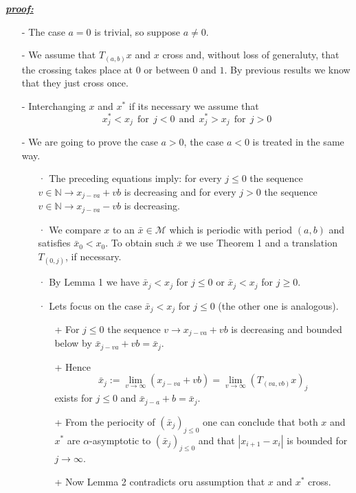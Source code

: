 \documentclass{article}
\begin{document}
\color{blue}
	\noindent \underline{\textbf{\textit{proof:}}} 		
		\begin{itemize}
			\item[-] The case $a = 0$ is trivial, so suppose $a \neq 0$.
			\item[-] We assume that $T_{(a, b)}x$ and $x$ cross and, without loss of generaluty, that the crossing takes place at $0$ or between $0$ and $1$. By previous results we know that they just cross once.
			\item[-] Interchanging $x$ and $x^{*}$ if its necessary we assume that
				$$
					x_{j}^{*} < x_j \ \ \text{for} \ \ j < 0 \ \ \text{and} \ \ x_{j}^{*} > x_j \ \ \text{for} \ \ j > 0
				$$ 
			\item[-] We are going to prove the case $a > 0$, the case $a < 0$ is treated in the same way.
			\begin{itemize}
				\item[·] The preceding equations imply: for every $j \leq 0$ the sequence $v \in \mathbb{N} \rightarrow x_{j - va} + vb$ is decreasing and for every $j > 0$ the sequence $v \in \mathbb{N} \rightarrow x_{j - va} - vb$ is decreasing.
				\item[·] We compare $x$ to an $\bar{x} \in \mathcal{M}$ which is periodic with period $(a, b)$ and satisfies $\bar{x}_{0} < x_{0}$. To obtain such $\bar{x}$ we use Theorem 1 and a translation $T_{(0, j)}$, if necessary.
				\item[·] By Lemma 1 we have $\bar{x}_{j} < x_{j}$ for $j \leq 0$ or $\bar{x}_{j} < x_{j}$ for $j \geq 0$.
				\item[·] Lets focus on the case $\bar{x}_{j} < x_{j}$ for $j \leq 0$ (the other one is analogous).
				\begin{itemize}
					\item[+] For $j \leq 0$ the sequence $v \rightarrow x_{j - va} + vb$ is decreasing and bounded below by $\bar{x}_{j - va} + vb = \bar{x}_{j}$. 
					\item[+] Hence
						$$
							\bar{x}_{j} := \lim_{ v \rightarrow \infty} (x_{j - va} + vb) = \lim_{v \rightarrow \infty} (T_{(va, vb)} x)_{j}
						$$
					exists for $j \leq 0$ and $\bar{x}_{j - a} + b = \bar{x}_j$.
					\item[+] From the periocity of $(\bar{x}_j)_{j \leq 0}$ one can conclude that both $x$ and $x^{*}$ are $\alpha$-asymptotic to $(\bar{x}_j)_{j \leq 0}$ and that $| x_{i + 1} - x_{i} |$ is bounded for $j \rightarrow \infty$.
					\item[+] Now Lemma 2 contradicts oru assumption that $x$ and $x^{*}$ cross.
				\end{itemize}
			\end{itemize}
		\end{itemize}
	
\end{document}
